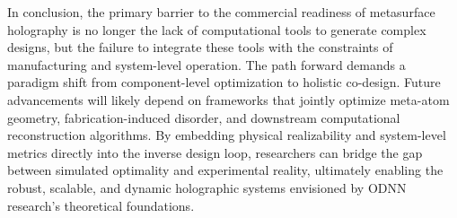 In conclusion, the primary barrier to the commercial readiness of metasurface holography is no longer the lack of computational tools to generate complex designs, but the failure to integrate these tools with the constraints of manufacturing and system-level operation. The path forward demands a paradigm shift from component-level optimization to holistic co-design. Future advancements will likely depend on frameworks that jointly optimize meta-atom geometry, fabrication-induced disorder, and downstream computational reconstruction algorithms. By embedding physical realizability and system-level metrics directly into the inverse design loop, researchers can bridge the gap between simulated optimality and experimental reality, ultimately enabling the robust, scalable, and dynamic holographic systems envisioned by ODNN research's theoretical foundations.
